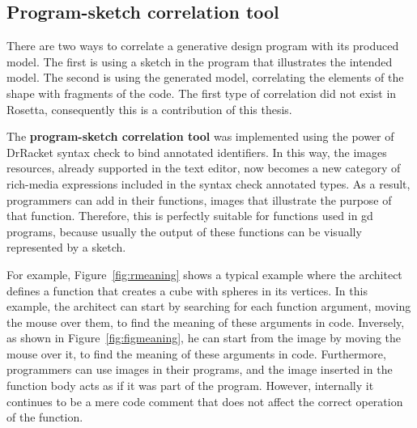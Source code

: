 \subsection{Program-sketch correlation tool}
\label{sec:psct}

There are two ways to correlate a generative design program with its produced model. The first is using a sketch in the program that illustrates the intended model. The second is using the generated model, correlating the elements of the shape with fragments of the code. The first type of correlation did not exist in Rosetta, consequently this is a contribution of this thesis.

The \textbf{program-sketch correlation tool} was implemented using the power of DrRacket syntax check to bind annotated identifiers. In this way, the images resources, already supported in the text editor, now becomes a new category of rich-media expressions included in the syntax check annotated types. As a result, programmers can add in their functions, images that illustrate the purpose of that function. Therefore, this is perfectly suitable for functions used in \gls{gd} programs, because usually the output of these functions can be visually represented by a sketch.

For example, Figure~\ref{fig:rmeaning} shows a typical example where the architect defines a function that creates a cube with spheres in its vertices. In this example, the architect can start by searching for each function argument, moving the mouse over them, to find the meaning of these arguments in code. Inversely, as shown in Figure~\ref{fig:figmeaning}, he can start from the image by moving the mouse over it, to find the meaning of these arguments in code. Furthermore, programmers can use images in their programs, and the image inserted in the function body acts as if it was part of the program. However, internally it continues to be a mere code comment that does not affect the correct operation of the function.    

